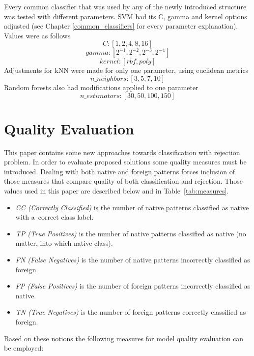 Every common classifier that was used by any of the newly introduced structure was tested with different parameters. SVM had its C, gamma and kernel options adjusted (see Chapter \ref{common_classifiers} for every parameter explanation). Values were as follows \[ C: [ 1, 2, 4, 8, 16 ] \] \[ gamma: [ 2^{-1}, 2^{-2}, 2^{-3}, 2^{-4} ] \]  \[ kernel: [ rbf, poly ] \] 
Adjustments for kNN were made for only one parameter, using euclidean metrics \[ n\_neighbors: [ 3, 5, 7, 10 ] \]
Random forests also had modifications applied to one parameter \[ n\_estimators: [ 30, 50, 100, 150 ] \]

\section{Quality Evaluation} \label{quality_measures}

This paper contains some new approaches towards classification with rejection problem. In order to evaluate proposed solutions some quality measures must be introduced. Dealing with both native and foreign patterns forces inclusion of those measures that compare quality of both classification and rejection. Those values used in this paper are described below and in Table~\ref{tab:measures}.

\begin{itemize}
	\item \emph{CC (Correctly Classified)} is the number of native patterns classified as native with a~correct class label.
	\item \emph{TP (True Positives)} is the number of native patterns classified as native (no matter, into which native class).
	\item \emph{FN (False Negatives)} is the number of native patterns incorrectly classified as foreign.
	\item \emph{FP (False Positives)} is the number of foreign patterns incorrectly classified as native.
	\item \emph{TN (True Negatives)} is the number of foreign patterns correctly classified as foreign.
\end{itemize}

Based on these notions the following measures for model quality evaluation can be employed:

